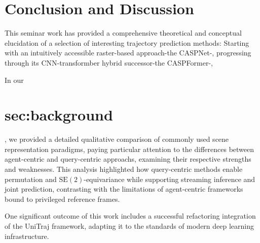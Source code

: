 \section{Conclusion and Discussion}
\label{ch:conclusion_future}

This seminar work has provided a comprehensive theoretical and conceptual elucidation of a selection of interesting trajectory prediction methods: Starting with an intuitively accessible raster-based approach-the CASPNet-, progressing through its CNN-transformber hybrid successor-the CASPFormer-, %

In our \section{sec:background}, we provided a detailed qualitative comparison of commonly used scene representation paradigms, paying particular attention to the differences between agent-centric and query-centric approachs, examining their respective strengths and weaknesses. This analysis highlighted how query-centric methods enable permutation and $\mathrm{SE}(2)$-equivariance while supporting streaming inference and joint prediction, contrasting with the limitations of agent-centric frameworks bound to privileged reference frames.


One significant outcome of this work includes a successful refactoring integration of the UniTraj framework, adapting it to the standards of modern deep learning infrastructure.


